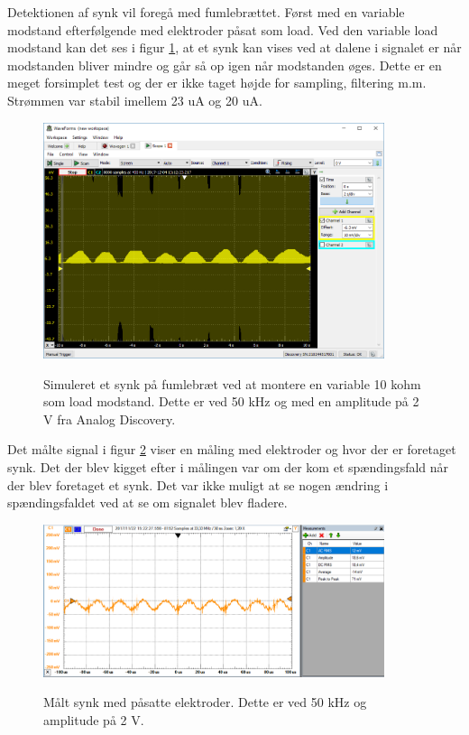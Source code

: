 Detektionen af synk vil foregå med fumlebrættet. Først med en variable modstand efterfølgende med elektroder påsat som load. Ved den variable load modstand kan det ses i figur \ref{fig:10kohmdummysynk}, at et synk kan vises ved at dalene i signalet er når modstanden bliver mindre og går så op igen når modstanden øges. Dette er en meget forsimplet test og der er ikke taget højde for sampling, filtering m.m. Strømmen var stabil imellem 23 uA og 20 uA.

\begin{figure}[H]
\centering
{\includegraphics[width=10cm]
{Figure/10kohmdummysynk}}
\caption{Simuleret et synk på fumlebræt ved at montere en variable 10 kohm som load modstand. Dette er ved 50 kHz og med en amplitude på 2 V fra Analog Discovery.}
\label{fig:10kohmdummysynk}
\end{figure}


Det målte signal i figur \ref{fig:synk1} viser en måling med elektroder og hvor der er foretaget synk. Det der blev kigget efter i målingen var om der kom et spændingsfald når der blev foretaget et synk. Det var ikke muligt at se nogen ændring i spændingsfaldet ved at se om signalet blev fladere. 

\begin{figure}[H]
\centering
{\includegraphics[width=10cm]
{Figure/synk1}}
\caption{Målt synk med påsatte elektroder. Dette er ved 50 kHz og amplitude på 2 V.}
\label{fig:synk1}
\end{figure}








